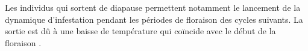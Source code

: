 
Les individus qui sortent de diapause permettent notamment le lancement de la dynamique d'infestation pendant les périodes de floraison des cycles suivants.
La sortie est dû à une baisse de température qui coïncide avec le début de la floraison \citep{pauldiap}.
























